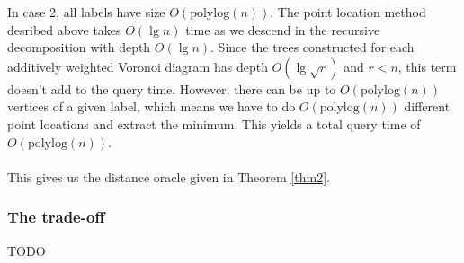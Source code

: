 In case 2, all labels have size $O(\text{polylog}(n))$. The point location method desribed
above takes $O(\lg n)$ time as we descend in the recursive decomposition with depth
$O(\lg n)$. Since the trees constructed for each additively weighted Voronoi diagram has
depth $O(\lg \sqrt{r})$ and $r<n$, this term doesn't add to the query time. However,
there can be up to $O(\text{polylog}(n))$ vertices of a given label, which means we have
to do $O(\text{polylog}(n))$ different point locations and extract the minimum. This
yields a total query time of $O(\text{polylog}(n))$. \\
\\
This gives us the distance oracle given in Theorem \ref{thm2}.

\subsubsection{The trade-off}
TODO \\
